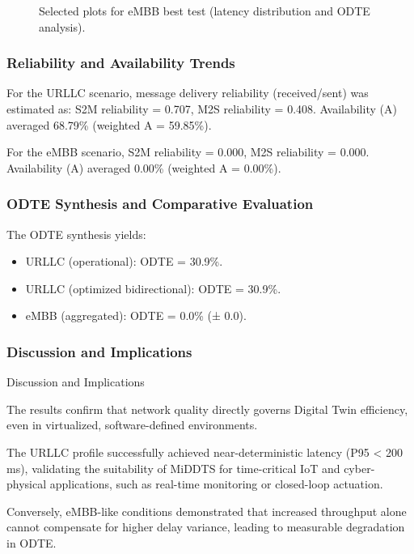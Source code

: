 \begin{figure}[ht]
  \centering
  
  \caption{Selected plots for eMBB best test (latency distribution and ODTE analysis).}
\end{figure}

\subsubsection{Reliability and Availability Trends}

For the URLLC scenario, message delivery reliability (received/sent) was estimated as: S2M reliability = 0.707, M2S reliability = 0.408. Availability (A) averaged 68.79\% (weighted A = 59.85\%).

For the eMBB scenario, S2M reliability = 0.000, M2S reliability = 0.000. Availability (A) averaged 0.00\% (weighted A = 0.00\%).

\subsubsection{ODTE Synthesis and Comparative Evaluation}

The ODTE synthesis yields:
\begin{itemize}
  \item URLLC (operational): ODTE = 30.9\%.
  \item URLLC (optimized bidirectional): ODTE = 30.9\%.
  \item eMBB (aggregated): ODTE = 0.0\% (± 0.0).
\end{itemize}

\subsubsection{Discussion and Implications}

Discussion and Implications 

 The results confirm that network quality directly governs Digital Twin efficiency, even in virtualized, software-defined environments.

 The URLLC profile successfully achieved near-deterministic latency (P95 < 200 ms), validating the suitability of MiDDTS for time-critical IoT and cyber-physical applications, such as real-time monitoring or closed-loop actuation.

 Conversely, eMBB-like conditions demonstrated that increased throughput alone cannot compensate for higher delay variance, leading to measurable degradation in ODTE.

